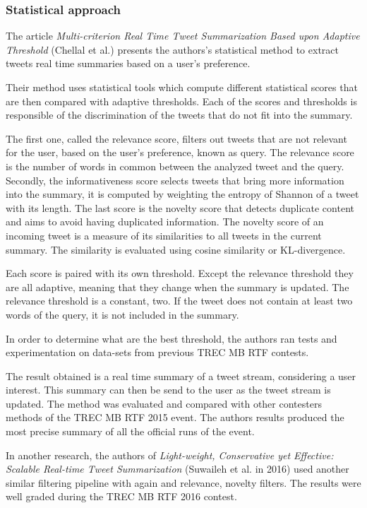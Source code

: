 \documentclass{llncs}
\begin{document}
\subsubsection{Statistical approach}

The article \textit{Multi-criterion Real Time Tweet Summarization Based upon
Adaptive Threshold} (Chellal et al.) \cite{chellal_multi-criterion_2016}
presents the authors's statistical method to extract tweets real time summaries
based on a user's preference.

Their method uses statistical tools which compute different statistical scores
that are then compared with adaptive thresholds. Each of the scores and
thresholds is responsible of the discrimination of the tweets that do not fit
into the summary.

The first one, called the relevance score, filters out tweets that are not
relevant for the user, based on the user's preference, known as query. The
relevance score is the number of words in common between the analyzed tweet and
the query. Secondly, the informativeness score selects tweets that bring more
information into the summary, it is computed by weighting the entropy of
Shannon of a tweet with its length. The last score is the novelty score that
detects duplicate content and aims to avoid having duplicated information. The
novelty score of an incoming tweet is a measure of its similarities to all
tweets in the current summary. The similarity is evaluated using cosine
similarity or KL-divergence.

Each score is paired with its own threshold. Except the relevance threshold
they are all adaptive, meaning that they change when the summary is updated.
The relevance threshold is a constant, two. If the tweet does not contain at
least two words of the query, it is not included in the summary.

In order to determine what are the best threshold, the authors ran tests and
experimentation on data-sets from previous TREC MB RTF contests.

The result obtained is a real time summary of a tweet stream, considering a
user interest. This summary can then be send to the user as the tweet stream is
updated. The method was evaluated and compared with other contesters methods of
the TREC MB RTF 2015 event. The authors results produced the most precise
summary of all the official runs of the event.

In another research, the authors of \textit{Light-weight, Conservative yet
Effective: Scalable Real-time Tweet Summarization} (Suwaileh et al. in 2016)
\cite{suwaileh_light-weight_nodate} used another similar filtering pipeline
with again and relevance, novelty filters. The results were well graded during
the TREC MB RTF 2016 contest.
\end{document}
